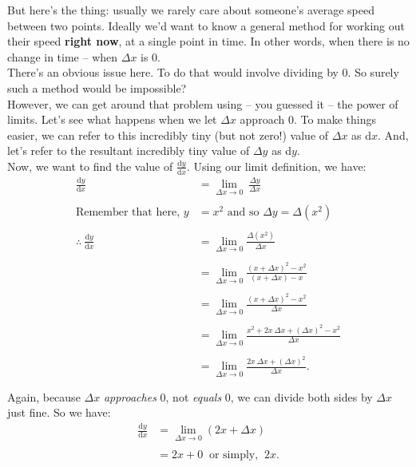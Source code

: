 \documentclass[11pt]{article}
\numberwithin{equation}{section}
\begin{document}
But here's the thing: usually we rarely care about someone's average speed between two points. Ideally we'd want to know a general method for working out their speed \textbf{right now}, at a single point in time. In other words, when there is no change in time -- when \(\Delta x\) is 0. 
\\ There's an obvious issue here. To do that would involve dividing by 0. So surely such a method would be impossible?
\\ However, we can get around that problem using -- you guessed it -- the power of limits. Let's see what happens when we let \(\Delta x\) approach 0. To make things easier, we can refer to this incredibly tiny (but not zero!) value of \(\Delta x\) as d\(x\). And, let's refer to the resultant incredibly tiny value of \(\Delta y\) as d\(y\). 
\\ Now, we want to find the value of \(\frac{\textrm{d}y}{\textrm{d}x}\). Using our limit definition, we have:
\begin{align*}
\frac{\textrm{d}y}{\textrm{d}x} &= \lim_{\Delta x \to 0} \ \frac{\Delta y}{\Delta x} \\ \\
\textrm{Remember that here, } y &= x^2 \textrm{ and so } \Delta y = \Delta(x^2) \\ \\
\therefore{} \ \frac{\textrm{d}y}{\textrm{d}x} &= \lim_{\Delta x \to 0} \frac{\Delta(x^2)}{\Delta x}  \\ \\
&= \lim_{\Delta x \to 0} \frac{(x + \Delta x)^2 - x^2}{(x + \Delta x) - x} \\ \\
&= \lim_{\Delta x \to 0} \frac{(x + \Delta x)^2 - x^2}{\Delta x} \\ \\
&= \lim_{\Delta x \to 0} \frac{x^2 + 2x \ \Delta x + (\Delta x)^2 - x^2}{\Delta x} \\ \\
&= \lim_{\Delta x \to 0} \frac{2x \ \Delta x + (\Delta x)^2}{\Delta x}. \\ \\
\end{align*}
Again, because \(\Delta x\) \textit{approaches} 0, not \textit{equals} 0, we can divide both sides by \(\Delta x\) just fine. So we have:
\begin{align*}
\frac{\textrm{d}y}{\textrm{d}x} &= \lim_{\Delta x \to 0} \left( 2x + \Delta x \right) \\ \\
&= 2x + 0 \ \textrm{ or simply, } \ 2x.
\end{align*}
\end{document}
